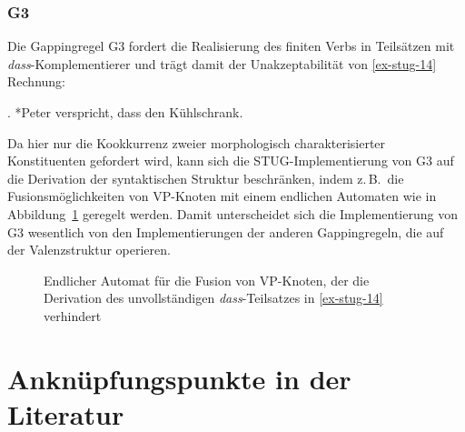 \subsubsection*{G3}

Die Gappingregel G3 fordert die Realisierung des finiten Verbs in Teilsätzen mit \emph{dass}-Kom\-ple\-mentierer und trägt damit der Unakzeptabilität von \ref{ex-stug-14} Rechnung:  

\ex. \label{ex-stug-14} *Peter verspricht, dass den Kühlschrank.

Da hier nur die Kookkurrenz zweier morphologisch charakterisierter Konstituenten gefordert wird, kann sich die STUG-Implementierung von G3 auf die Derivation der syntaktischen Struktur beschränken, indem z.\,B.\ die Fusionsmöglichkeiten von VP-Knoten mit einem endlichen Automaten wie in Abbildung~\ref{fig-stug-18} geregelt werden. Damit unterscheidet sich die Implementierung von G3 wesentlich von den Implementierungen der anderen Gappingregeln, die auf der Valenzstruktur operieren.
\begin{figure}[t]
\centering
{}
\caption{\label{fig-stug-18}Endlicher Automat für die Fusion von VP-Knoten, der die Derivation des unvollständigen \emph{dass}-Teilsatzes in \ref{ex-stug-14} verhindert}
\end{figure}



\section{Anknüpfungspunkte in der Literatur} \label{sec-stug-implikationen}

